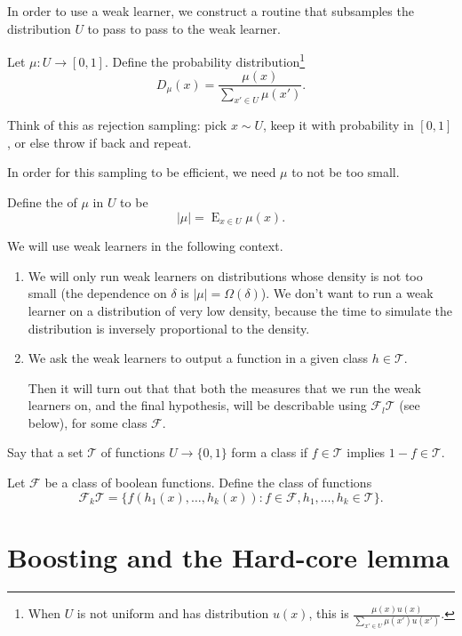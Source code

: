 In order to use a weak learner, we construct a routine that subsamples the distribution $U$ to pass to pass to the weak learner.
\begin{df}
Let $\mu:U\to [0,1]$. Define the probability distribution\footnote{When $U$ is not uniform and has distribution $u(x)$, this is $\frac{\mu(x)u(x)}{\sum_{x'\in U} \mu(x')u(x')}$.}
$$
D_\mu(x) = \frac{\mu(x)}{\sum_{x'\in U}\mu(x')}.
$$
\end{df}
Think of this as rejection sampling: pick $x\sim U$, keep it with probability in $[0,1]$, or else throw if back and repeat.

In order for this sampling to be efficient, we need $\mu$ to not be too small.
\begin{df}
Define the  of $\mu$ in $U$ to be
$$|\mu| = \operatorname{E}_{x\in U} \mu(x).$$ 
\end{df}

We will use weak learners in the following context. 
\begin{enumerate}
\item
We will only run weak learners on distributions whose density is not too small (the dependence on $\delta$ is $|\mu|=\Omega(\delta)$). We don't want to run a weak learner on a distribution of very low density, because the time to simulate  the distribution is inversely proportional to the density.
\item
We ask the weak learners to output a function in a given class $h\in \mathcal T$. 

Then it will turn out that that both the measures that we run the weak learners on, and the final hypothesis, will be describable using $\mathcal F_l \mathcal T$ (see below), for some class $\mathcal F$.
\end{enumerate}

\begin{df}
Say that a set $\mathcal T$ of functions $U\to \{0,1\}$ form a class if $f\in \mathcal T$ implies $1-f \in \mathcal T$. 

Let $\mathcal F$ be a class of boolean functions. Define the class of functions
$$
\mathcal F_k \mathcal T = \{f(h_1(x),\ldots, h_k(x)) : f\in\mathcal F, h_1,\ldots, h_k\in \mathcal T\}.
$$
\end{df}


\section{Boosting and the Hard-core lemma}

